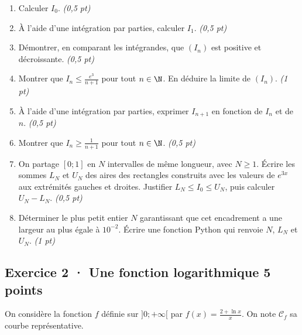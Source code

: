 \begin{enumerate}

\item Calculer $I_0$. \hfill\textit{(0{,}5 pt)}

\item À l'aide d'une intégration par parties, calculer $I_1$. \hfill\textit{(0{,}5 pt)}

\item Démontrer, en comparant les intégrandes, que $(I_n)$ est positive et décroissante. \hfill\textit{(0{,}5 pt)}

\item Montrer que $I_n\le\frac{e^{3}}{n+1}$ pour tout $n\in\N$. En déduire la limite de $(I_n)$. \hfill\textit{(1 pt)}

\item À l'aide d'une intégration par parties, exprimer $I_{n+1}$ en fonction de $I_n$ et de $n$. \hfill\textit{(0{,}5 pt)}

\item Montrer que $I_n\ge\frac1{n+1}$ pour tout $n\in\N$. \hfill\textit{(0{,}5 pt)}

\item On partage $[0;1]$ en $N$ intervalles de même longueur, avec $N\ge1$. Écrire les sommes $L_N$ et $U_N$ des aires des rectangles construits avec les valeurs de $e^{3x}$ aux extrémités gauches et droites. Justifier $L_N\le I_0\le U_N$, puis calculer $U_N-L_N$. \hfill\textit{(0{,}5 pt)}

\item Déterminer le plus petit entier $N$ garantissant que cet encadrement a une largeur au plus égale à $10^{-2}$. Écrire une fonction Python qui renvoie $N$, $L_N$ et $U_N$. \hfill\textit{(1 pt)}

\end{enumerate}

\subsection*{Exercice 2 · Une fonction logarithmique \hfill 5 points}On considère la fonction $f$ définie sur $]0;+\infty[$ par $f(x)=\frac{2+\ln x}x$. On note $\mathcal C_f$ sa courbe représentative.

